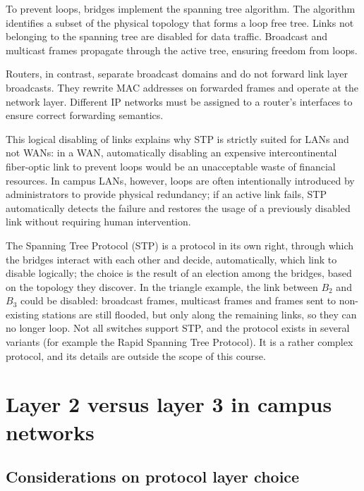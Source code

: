 To prevent loops, bridges implement the spanning tree algorithm. The algorithm identifies a subset of the physical topology that forms a loop free tree. Links not belonging to the spanning tree are disabled for data traffic. Broadcast and multicast frames propagate through the active tree, ensuring freedom from loops.

Routers, in contrast, separate broadcast domains and do not forward link layer broadcasts. They rewrite MAC addresses on forwarded frames and operate at the network layer. Different IP networks must be assigned to a router's interfaces to ensure correct forwarding semantics.


This logical disabling of links explains why STP is strictly suited for LANs and not WANs: in a WAN, automatically disabling an expensive intercontinental fiber-optic link to prevent loops would be an unacceptable waste of financial resources. In campus LANs, however, loops are often intentionally introduced by administrators to provide physical redundancy; if an active link fails, STP automatically detects the failure and restores the usage of a previously disabled link without requiring human intervention.

\begin{center}
\end{center}


The Spanning Tree Protocol (STP) is a protocol in its own right, through which the bridges interact with each other and decide, automatically, which link to disable logically; the choice is the result of an election among the bridges, based on the topology they discover. In the triangle example, the link between $B_2$ and $B_3$ could be disabled: broadcast frames, multicast frames and frames sent to non-existing stations are still flooded, but only along the remaining links, so they can no longer loop. Not all switches support STP, and the protocol exists in several variants (for example the Rapid Spanning Tree Protocol). It is a rather complex protocol, and its details are outside the scope of this course.

\section{Layer 2 versus layer 3 in campus networks}

\subsection{Considerations on protocol layer choice}

